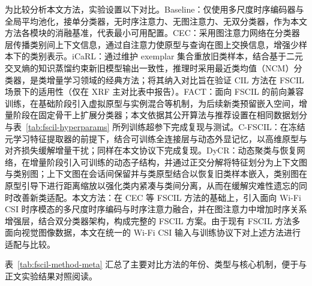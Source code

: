
为比较分析本文方法，实验设置以下对比。Baseline：仅使用多尺度时序编码器与全局平均池化，接单分类器，无时序注意力、无图注意力、无双分类器，作为本文方法各模块的消融基准，代表最小可用配置。CEC\cite{zhang2021cec}：采用图注意力网络在分类器层传播类别间上下文信息，通过自注意力使原型与查询在图上交换信息，增强少样本下的类别表示。iCaRL\cite{rebuffi2017icarl}：通过维护 exemplar 集合重放旧类样本，结合基于二元交叉熵的知识蒸馏约束新旧模型输出一致性，推理时采用最近类均值（NCM）分类器，是类增量学习领域的经典方法；将其纳入对比旨在验证 CIL 方法在 FSCIL 场景下的适用性（仅在 XRF 主对比表中报告）。FACT\cite{zhou2022fact}：面向 FSCIL 的前向兼容训练，在基础阶段引入虚拟原型与实例混合等机制，为后续新类预留嵌入空间，增量阶段在固定骨干上扩展分类器；本文依据其公开算法与推荐设置在相同数据划分与表~\ref{tab:fscil-hyperparams} 所列训练超参下完成复现与测试。C-FSCIL\cite{hersche2022cfscil}：在冻结元学习特征提取器的前提下，结合可训练全连接层与动态外显记忆，以高维原型与对齐损失缓解增量干扰；同样在本文协议下完成复现。DyCR\cite{pan2025dycr}：动态聚类与恢复网络，在增量阶段引入可训练的动态子结构，并通过正交分解将特征划分为上下文图与类别图；上下文图在会话间保留并与类原型结合以恢复旧类样本嵌入，类别图在原型引导下进行距离缩放以强化类内紧凑与类间分离，从而在缓解灾难性遗忘的同时改善新类适配。本文方法：在 CEC 等 FSCIL 方法的基础上，引入面向 Wi-Fi CSI 时序模态的多尺度时序编码与时序注意力融合，并在图注意力中增加时序关系增强层，结合双分类器架构，构成完整的 FSCIL 方案。由于现有 FSCIL 方法多面向视觉图像数据，本文在统一的 Wi-Fi CSI 输入与训练协议下对上述方法进行适配与比较。

表~\ref{tab:fscil-method-meta} 汇总了主要对比方法的年份、类型与核心机制，便于与正文实验结果对照阅读。

